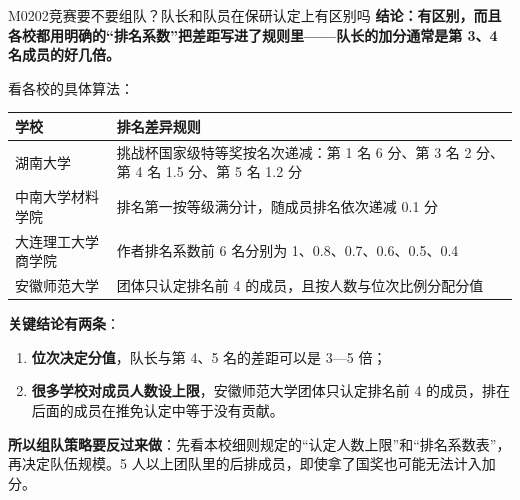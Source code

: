 \begin{qa}{M0202}{竞赛要不要组队？队长和队员在保研认定上有区别吗}
\textbf{结论：有区别，而且各校都用明确的“排名系数”把差距写进了规则里——队长的加分通常是第 3、4 名成员的好几倍。}

看各校的具体算法：

\par\vspace{2pt}\nobreak\begin{center}\footnotesize
\begin{tabularx}{\textwidth}{>{\raggedright\arraybackslash}X>{\raggedright\arraybackslash}X}
\toprule
\textbf{学校} & \textbf{排名差异规则} \\ \midrule
湖南大学 & 挑战杯国家级特等奖按名次递减：第 1 名 6 分、第 3 名 2 分、第 4 名 1.5 分、第 5 名 1.2 分 \\
中南大学材料学院 & 排名第一按等级满分计，随成员排名依次递减 0.1 分 \\
大连理工大学商学院 & 作者排名系数前 6 名分别为 1、0.8、0.7、0.6、0.5、0.4 \\
安徽师范大学 & 团体只认定排名前 4 的成员，且按人数与位次比例分配分值 \\
\bottomrule
\end{tabularx}
\end{center}\vspace{2pt}\par

\textbf{关键结论有两条}：
\begin{enumerate}
  \item \textbf{位次决定分值}，队长与第 4、5 名的差距可以是 3—5 倍；
  \item \textbf{很多学校对成员人数设上限}，安徽师范大学团体只认定排名前 4 的成员，排在后面的成员在推免认定中等于没有贡献。
\end{enumerate}

\textbf{所以组队策略要反过来做}：先看本校细则规定的“认定人数上限”和“排名系数表”，再决定队伍规模。5 人以上团队里的后排成员，即使拿了国奖也可能无法计入加分。
\end{qa}

